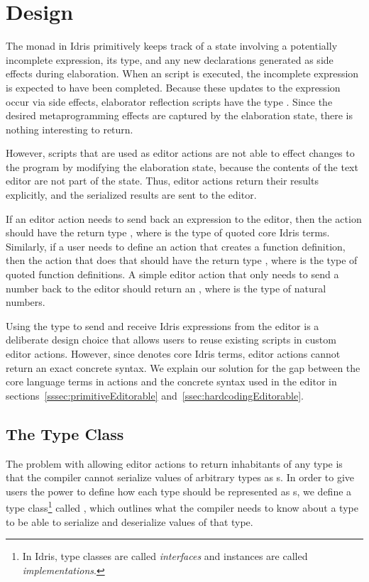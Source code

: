 \section{Design}\label{sec:design}

The \Elab{} monad in Idris primitively keeps track of a state
involving a potentially incomplete expression, its type, and any new declarations generated as
side effects during elaboration.
When an \Elab{} script is executed, the incomplete expression is expected to have been completed.
Because these updates to the expression occur via side effects, elaborator reflection scripts have the type \mbox{}. Since the
desired metaprogramming effects are captured by the elaboration state, there is
nothing interesting to return.

However, \Elab{} scripts that are used as editor actions are not able to effect changes to the program by modifying the elaboration state, because the contents of the text editor are not part of the state.
Thus, editor actions return their results explicitly, and the serialized results are sent to the editor.

If an editor action needs to send back an expression to the editor, then the
action should have the return type \mbox{}, where  is the type of
quoted core Idris terms.
Similarly, if a user needs to define an action that creates a function definition,
then the action that does that should have the return type \mbox{},
where  is the type of quoted function definitions.
A simple editor action that only needs to send a number back
to the editor should return an \mbox{}, where  is the
type of natural numbers.

Using the \TT{} type to send and receive Idris expressions from the editor is a
deliberate design choice that allows users to reuse existing \Elab{} scripts in
custom editor actions. However, since \TT{} denotes core Idris terms, editor
actions cannot return an exact concrete syntax. We explain our solution for the
gap between the core language terms in \Elab{} actions and the concrete syntax
used in the editor in sections~\ref{sssec:primitiveEditorable}
and~\ref{ssec:hardcodingEditorable}.

\subsection{The \Editorable{} Type Class}
\label{ssec:editorable}

The problem with allowing editor actions to return inhabitants of any
type is that the compiler cannot serialize values of arbitrary types
as \sexp{}s.  In order
to give users the power to define how each type should
be represented as \sexp{}s, we define a type class\footnote{In Idris,
  type classes are called \emph{interfaces} and instances are called
  \emph{implementations}.}  called \Editorable{}, which outlines what
the compiler needs to know about a type to be able to serialize and
deserialize values of that type.

